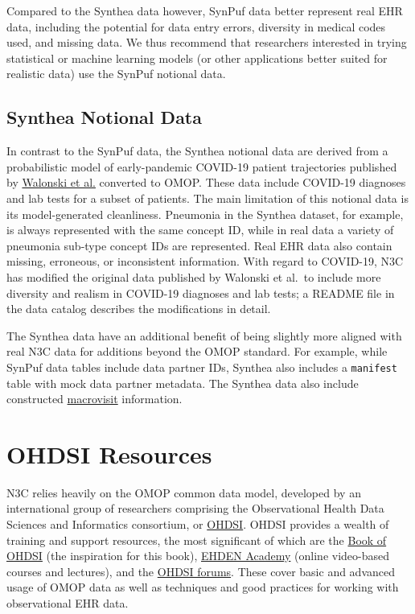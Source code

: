 \documentclass[
  letterpaper,
  DIV=11,
  numbers=noendperiod]{scrreprt}
\begin{document}
Compared to the Synthea data however, SynPuf data better represent real
EHR data, including the potential for data entry errors, diversity in
medical codes used, and missing data. We thus recommend that researchers
interested in trying statistical or machine learning models (or other
applications better suited for realistic data) use the SynPuf notional
data.

\hypertarget{sec-support-notional-synthea}{%
\subsection{Synthea Notional Data}\label{sec-support-notional-synthea}}

In contrast to the SynPuf data, the Synthea notional data are derived
from a probabilistic model of early-pandemic COVID-19 patient
trajectories published by
\href{https://www.sciencedirect.com/science/article/pii/S2666521220300077}{Walonski
et al.} converted to OMOP. These data include COVID-19 diagnoses and lab
tests for a subset of patients. The main limitation of this notional
data is its model-generated cleanliness. Pneumonia in the Synthea
dataset, for example, is always represented with the same concept ID,
while in real data a variety of pneumonia sub-type concept IDs are
represented. Real EHR data also contain missing, erroneous, or
inconsistent information. With regard to COVID-19, N3C has modified the
original data published by Walonski et al.~to include more diversity and
realism in COVID-19 diagnoses and lab tests; a README file in the data
catalog describes the modifications in detail.

The Synthea data have an additional benefit of being slightly more
aligned with real N3C data for additions beyond the OMOP standard. For
example, while SynPuf data tables include data partner IDs, Synthea also
includes a \texttt{manifest} table with mock data partner metadata. The
Synthea data also include constructed
\protect\hyperlink{macrovisits}{macrovisit} information.

\hypertarget{sec-support-ohdsi}{%
\section{OHDSI Resources}\label{sec-support-ohdsi}}

N3C relies heavily on the OMOP common data model, developed by an
international group of researchers comprising the Observational Health
Data Sciences and Informatics consortium, or
\href{https://ohdsi.org}{OHDSI}. OHDSI provides a wealth of training and
support resources, the most significant of which are the
\href{https://ohdsi.github.io/TheBookOfOhdsi/}{Book of OHDSI} (the
inspiration for this book), \href{https://academy.ehden.eu/}{EHDEN
Academy} (online video-based courses and lectures), and the
\href{https://forums.ohdsi.org/}{OHDSI forums}. These cover basic and
advanced usage of OMOP data as well as techniques and good practices for
working with observational EHR data.
\end{document}
